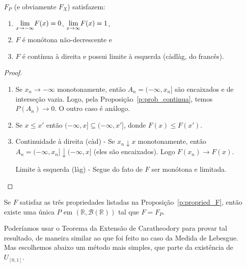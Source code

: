 \begin{proposition}
  \label{p:propried_F}
  $F_P$ (e obviamente $F_X$) satisfazem:
  \begin{enumerate}[\quad a)]
  \item $\smash{\lim\limits_{x \to -\infty}} F(x) = 0$, $\smash{\lim\limits_{x \to \infty}} F(x) = 1$,
  \item $F$ é monótona não-decrescente e
  \item $F$ é contínua à direita e possui limite à esquerda (càdlàg, do francês). 
  \end{enumerate}
\end{proposition}

\begin{proof}
  \begin{enumerate}[\quad a)]
  \item Se $x_n \to -\infty$ monotonamente, então $A_n = (-\infty, x_n]$ são encaixados e de interseção vazia.
    Logo, pela Proposição~\ref{p:prob_continua}, temos $P(A_n) \to 0$.
    O outro caso é análogo.
  \item Se $x \leq x'$ então $(-\infty, x] \subseteq (-\infty,x']$, donde $F(x) \leq F(x')$.
  \item Continuidade à direita (càd) - Se $x_n \downarrow x$ monotonamente, então $A_n = (-\infty, x_n] \downarrow (-\infty, x]$ (eles são encaixados).
    Logo $F(x_n) \to F(x)$.

    Limite à esquerda (làg) - Segue do fato de $F$ ser monótona e limitada. \qedhere
  \end{enumerate}
\end{proof}

\begin{theorem}
  Se $F$ satisfaz as três propriedades listadas na Proposição~\ref{p:propried_F}, então existe uma única $P$ em $(\mathbb{R}, \mathcal{B}(\mathbb{R}))$ tal que $F = F_P$.
\end{theorem}

Poderíamos usar o Teorema da Extensão de Caratheodory para provar tal resultado, de maneira similar ao que foi feito no caso da Medida de Lebesgue.
Mas escolhemos abaixo um método mais simples, que parte da existência de $U_{[0,1]}$.

